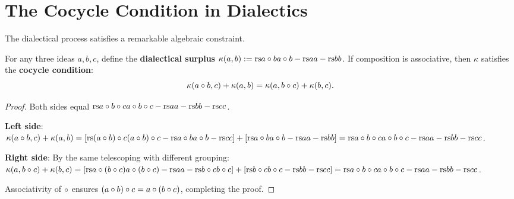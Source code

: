 \section{The Cocycle Condition in Dialectics}

The dialectical process satisfies a remarkable algebraic constraint.

\begin{theorem}
\label{thm:dialectical-cocycle}
For any three ideas $a, b, c$, define the \textbf{dialectical surplus}
$\kappa(a, b) := \mathrm{rs}{a \circ b}{a \circ b} - \mathrm{rs}{a}{a} - \mathrm{rs}{b}{b}$.
If composition is associative, then $\kappa$ satisfies the \textbf{cocycle
condition}:
\[
  \kappa(a \circ b, c) + \kappa(a, b)
  = \kappa(a, b \circ c) + \kappa(b, c).
\]
\end{theorem}

\begin{proof}
Both sides equal $\mathrm{rs}{a \circ b \circ c}{a \circ b \circ c}
- \mathrm{rs}{a}{a} - \mathrm{rs}{b}{b} - \mathrm{rs}{c}{c}$.

\textbf{Left side}: $\kappa(a \circ b, c) + \kappa(a, b)
= [\mathrm{rs}{(a \circ b) \circ c}{(a \circ b) \circ c}
- \mathrm{rs}{a \circ b}{a \circ b} - \mathrm{rs}{c}{c}]
+ [\mathrm{rs}{a \circ b}{a \circ b} - \mathrm{rs}{a}{a} - \mathrm{rs}{b}{b}]
= \mathrm{rs}{a \circ b \circ c}{a \circ b \circ c} - \mathrm{rs}{a}{a}
- \mathrm{rs}{b}{b} - \mathrm{rs}{c}{c}$.

\textbf{Right side}: By the same telescoping with different grouping:
$\kappa(a, b \circ c) + \kappa(b, c)
= [\mathrm{rs}{a \circ (b \circ c)}{a \circ (b \circ c)}
- \mathrm{rs}{a}{a} - \mathrm{rs}{b \circ c}{b \circ c}]
+ [\mathrm{rs}{b \circ c}{b \circ c} - \mathrm{rs}{b}{b} - \mathrm{rs}{c}{c}]
= \mathrm{rs}{a \circ b \circ c}{a \circ b \circ c} - \mathrm{rs}{a}{a}
- \mathrm{rs}{b}{b} - \mathrm{rs}{c}{c}$.

Associativity of $\circ$ ensures $(a \circ b) \circ c = a \circ
(b \circ c)$, completing the proof.
\end{proof}

